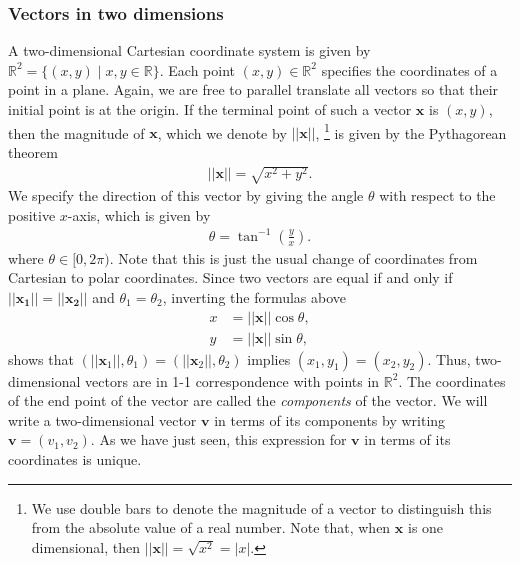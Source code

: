 \documentclass[12pt,letterpaper,reqno]{article}
\numberwithin{equation}{section}
\newcommand{\R}{\ensuremath{\mathbb R}}
\begin{document}
\subsubsection{Vectors in two dimensions}
A two-dimensional Cartesian coordinate system is given by $\R^2=\{(x,y) \mid x,y \in \R\}$. Each point $(x,y) \in \R^2$ specifies the coordinates of a point in a plane. Again, we are free to parallel translate all vectors so that their initial point is at the origin. If the terminal point of such a vector $\mathbf{x}$ is $(x,y)$, then the magnitude of $\mathbf{x}$, which we denote by $||\mathbf{x}||$, \footnote{We use double bars to denote the magnitude of a vector to distinguish this from the absolute value of a real number. Note that, when $\mathbf{x}$ is one dimensional, then $||\mathbf{x}||=\sqrt{x^2}=|x|$.} is given by the Pythagorean theorem 
\begin{align*}
	||\mathbf{x}||=\sqrt{x^2+y^2}.
\end{align*}
We specify the direction of this vector by giving the angle $\theta$ with respect to the positive $x$-axis, which is given by
\begin{align*}
	\theta=\tan^{-1}\left(\frac{y}{x}\right).
\end{align*}
where $\theta \in [0,2\pi)$. Note that this is just the usual change of coordinates from Cartesian to polar coordinates. Since two vectors are equal if and only if $||\mathbf{x_1}||=||\mathbf{x_2}||$ and $\theta_1=\theta_2$, inverting the formulas above
\begin{align*}
	x&=||\mathbf{x}||\cos \theta, \\
	y&=||\mathbf{x}||\sin \theta,
\end{align*}
shows that $(||\mathbf{x}_1||,\theta_1)=(||\mathbf{x}_2||,\theta_2)$ implies $(x_1,y_1)=(x_2,y_2)$. Thus, two-dimensional vectors are in 1-1 correspondence with points in $\R^2$. The coordinates of the end point of the vector are called the \emph{components} of the vector. We will write a two-dimensional vector $\mathbf{v}$ in terms of its components by writing $\mathbf{v}=(v_1,v_2)$. As we have just seen, this expression for $\mathbf{v}$ in terms of its coordinates is unique.
\end{document}
